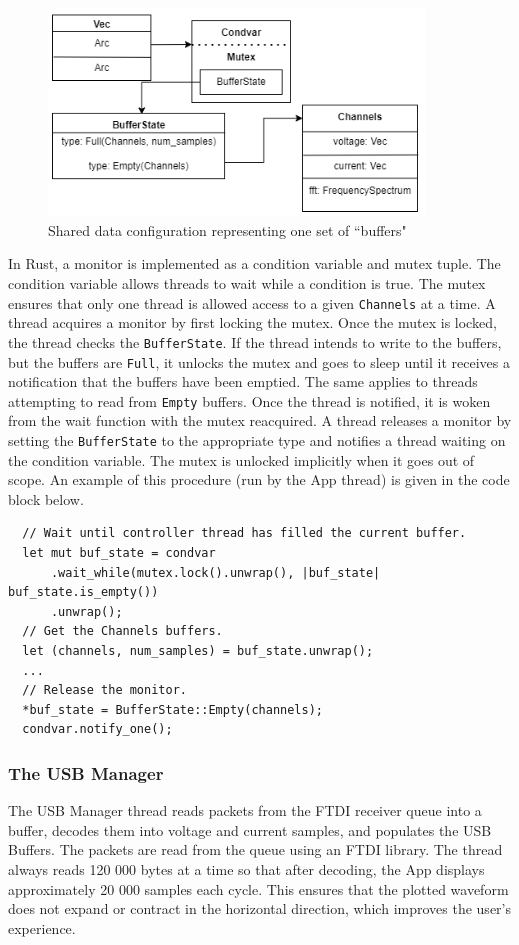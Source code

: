 \documentclass[letterpaper,11pt]{article}
\newcommand{\code}[1]{\texttt{#1}}
\begin{document}
\begin{figure}[H]
  \centering
  \includegraphics[width=10cm]{figures/buffer_config.drawio.png}
  \caption{Shared data configuration representing one set of ``buffers"}
  \label{fig:soft-buffer-config}
\end{figure}

In Rust, a monitor is implemented as a condition variable and mutex tuple. The condition
variable allows threads to wait while a condition is true. The mutex ensures that only
one thread is allowed access to a given \code{Channels} at a time. A thread acquires a
monitor by first locking the mutex. Once the mutex is locked, the thread checks the
\code{BufferState}. If the thread intends to write to the buffers, but the buffers are
\code{Full}, it unlocks the mutex and goes to sleep until it receives a notification
that the buffers have been emptied. The same applies to threads attempting to read from
\code{Empty} buffers. Once the thread is notified, it is woken from the wait function
with the mutex reacquired. A thread releases a monitor by setting the \code{BufferState}
to the appropriate type and notifies a thread waiting on the condition variable. The
mutex is unlocked implicitly when it goes out of scope. An example of this procedure
(run by the App thread) is given in the code block below.

\begin{verbatim}
  // Wait until controller thread has filled the current buffer.
  let mut buf_state = condvar
      .wait_while(mutex.lock().unwrap(), |buf_state| buf_state.is_empty())
      .unwrap();
  // Get the Channels buffers.
  let (channels, num_samples) = buf_state.unwrap();
  ...
  // Release the monitor.
  *buf_state = BufferState::Empty(channels);
  condvar.notify_one();
\end{verbatim}

\subsubsection{The USB Manager}
The USB Manager thread reads packets from the FTDI receiver queue into a buffer,
decodes them into voltage and current samples, and populates the USB Buffers.
The packets are read from the queue using an FTDI library. The thread always
reads 120 000 bytes at a time so that after decoding, the App displays
approximately 20 000 samples each cycle. This ensures that the plotted waveform
does not expand or contract in the horizontal direction, which improves the
user's experience.
\end{document}
